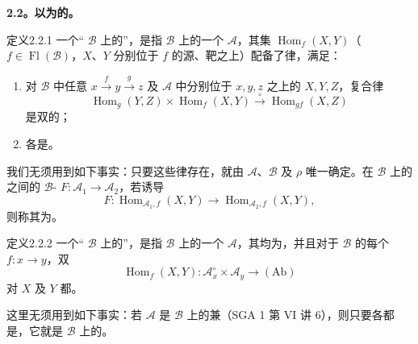 \textbf{2.2。以为的。}
\begin{SGAresult}{定义}{2.2.1}
一个“ $\mathcal B$ 上的”，是指 $\mathcal B$ 上的一个 $\mathcal A$，其集 $\operatorname{Hom}_f(X,Y)$（$f\in\operatorname{Fl}(\mathcal B)$，$X$、$Y$ 分别位于 $f$ 的源、靶之上）配备了律，满足：
\begin{enumerate}
\item[(i)] 对 $\mathcal B$ 中任意 $x\xrightarrow{f}y\xrightarrow{g}z$ 及 $\mathcal A$ 中分别位于 $x,y,z$ 之上的 $X,Y,Z$，复合律
\[
\operatorname{Hom}_g(Y,Z)\times\operatorname{Hom}_f(X,Y)\xrightarrow{\circ}\operatorname{Hom}_{gf}(X,Z)
\]
是双的；
\item[(ii)] 各是。
\end{enumerate}
\end{SGAresult}
我们无须用到如下事实：只要这些律存在，就由 $\mathcal A$、$\mathcal B$ 及 $\rho$ 唯一确定。在 $\mathcal B$ 上的之间的 $\mathcal B$- $F:\mathcal A_1\to\mathcal A_2$，若诱导
\[
F:\operatorname{Hom}_{\mathcal A_1,f}(X,Y)\longrightarrow\operatorname{Hom}_{\mathcal A_2,f}(X,Y),
\]
则称其为。
\begin{SGAresult}{定义}{2.2.2}
一个“ $\mathcal B$ 上的”，是指 $\mathcal B$ 上的一个 $\mathcal A$，其均为，并且对于 $\mathcal B$ 的每个 $f:x\to y$，双
\[
\operatorname{Hom}_f(X,Y):\mathcal A_x^\circ\times\mathcal A_y\longrightarrow(\mathrm{Ab})
\]
对 $X$ 及 $Y$ 都。
\end{SGAresult}
这里无须用到如下事实：若 $\mathcal A$ 是 $\mathcal B$ 上的兼（SGA 1 第 VI 讲 6），则只要各都是，它就是 $\mathcal B$ 上的。


